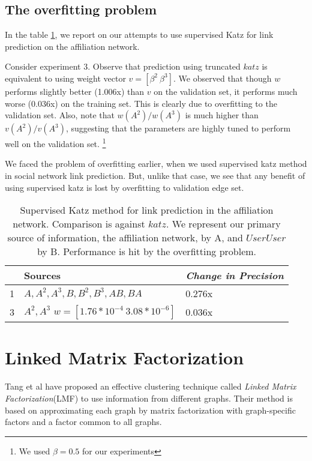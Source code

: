 \documentclass{report}
\begin{document}
\subsection{The overfitting problem}
In the table \ref{tab:supervisedAff}, we report on our attempts to use supervised Katz for link prediction on the affiliation network.

Consider experiment 3. Observe that prediction using truncated $katz$ is equivalent to using weight vector $v = [\beta^2 \ \beta^3]$. We observed that though $w$ performs slightly better (1.006x) than $v$ on the validation set, it performs much worse (0.036x) on the training set. This is clearly due to overfitting to the validation set. Also, note that $w(A^2)/w(A^3)$ is much higher than $v(A^2)/v(A^3)$, suggesting that the parameters are highly tuned to perform well on the validation set. \footnote{We used $\beta = 0.5$ for our experiments}

We faced the problem of overfitting earlier, when we used supervised katz method in social network link prediction. But, unlike that case, we see that any benefit of using supervised katz is lost by overfitting to validation edge set.

\begin{table}
\centering
\begin{tabular}{|l|p{5cm} |  p{2cm}|}
\hline
 & Sources & \textit{Change in Precision}\\[1ex]
\hline
1 & $A, A^2, A^3, B, B^2, B^3, AB, BA$ & 0.276x\\
\hline
3 & $A^{2}, A^{3}$ $w = [1.76*10^{-4}\ 3.08*10^{-6}]$& 0.036x\\
\hline
\end{tabular}
\caption{Supervised Katz method for link prediction in the affiliation network. Comparison is against $katz$. We represent our primary source of information, the affiliation network, by A, and $UserUser$ by B. Performance is hit by the overfitting problem.}
\label{tab:supervisedAff}
\end{table}

\section{Linked Matrix Factorization}
Tang et al have proposed an effective clustering technique called \textit{Linked Matrix Factorization}\cite{tangLMF}(LMF) to use information from different graphs. Their method is based on approximating each graph by matrix factorization with graph-specific factors and a factor common to all graphs. 
\end{document}

